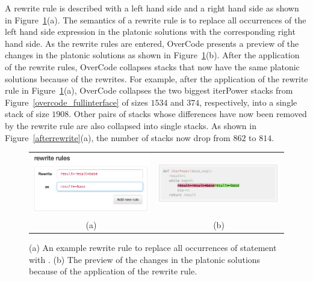 A rewrite rule is described with a left hand side and a right hand side as shown in Figure~\ref{rewriterule}(a). The semantics of a rewrite rule is to replace all occurrences of the left hand side expression in the platonic solutions with the corresponding right hand side. As the rewrite rules are entered, OverCode presents a preview of the changes in the platonic solutions as shown in Figure~\ref{rewriterule}(b). After the application of the rewrite rules, OverCode collapses stacks that now have the same platonic solutions because of the rewrites. For example, after the application of the rewrite rule in Figure~\ref{rewriterule}(a), OverCode collapses the two biggest iterPower stacks from Figure~\ref{overcode_fullinterface} of sizes $1534$ and $374$, respectively, into a single stack of size $1908$. Other pairs of stacks whose differences have now been removed by the rewrite rule are also collapsed into single stacks. As shown in Figure~\ref{afterrewrite}(a), the number of stacks now drop from $862$ to $814$.

\begin{figure}[htpb]
\begin{tabular}{c | c}
\begin{minipage}{.5\linewidth}
\centering
\includegraphics[scale=0.45]{Body/figures/overcode/rewriteRuleScreenshot.png}
\end{minipage}
&
\begin{minipage}{.5\linewidth}
\centering
\includegraphics[scale=0.40]{Body/figures/overcode/rewritePreviewScreenShot.png}
\end{minipage}
\\
(a) & (b)
\end{tabular}
\caption{(a) An example rewrite rule to replace all occurrences of statement  with . (b) The preview of the changes in the platonic solutions because of the application of the rewrite rule.}
\label{rewriterule}
\end{figure}

